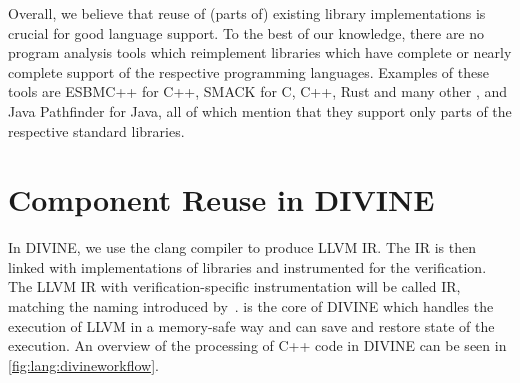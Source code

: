 Overall, we believe that reuse of (parts of) existing library implementations is crucial for good language support.
To the best of our knowledge, there are no program analysis tools which reimplement libraries which have complete or nearly complete support of the
respective programming languages.
Examples of these tools are ESBMC++  for C++, SMACK for C, C++, Rust and many other , and Java Pathfinder  for Java, all of which mention that they support only parts of the respective standard libraries.

\section{Component Reuse in DIVINE}\label{sec:lang:divine}

In DIVINE, we use the clang compiler to produce LLVM IR.
The IR is then linked with implementations of libraries and instrumented for the verification.
The LLVM IR with verification-specific instrumentation will be called \divm IR,
matching the naming introduced by~.
\divm is the core of DIVINE which handles the execution of LLVM in a memory-safe
way and can save and restore state of the execution.
An overview of the processing of C++ code in DIVINE can be seen in \autoref{fig:lang:divineworkflow}.


